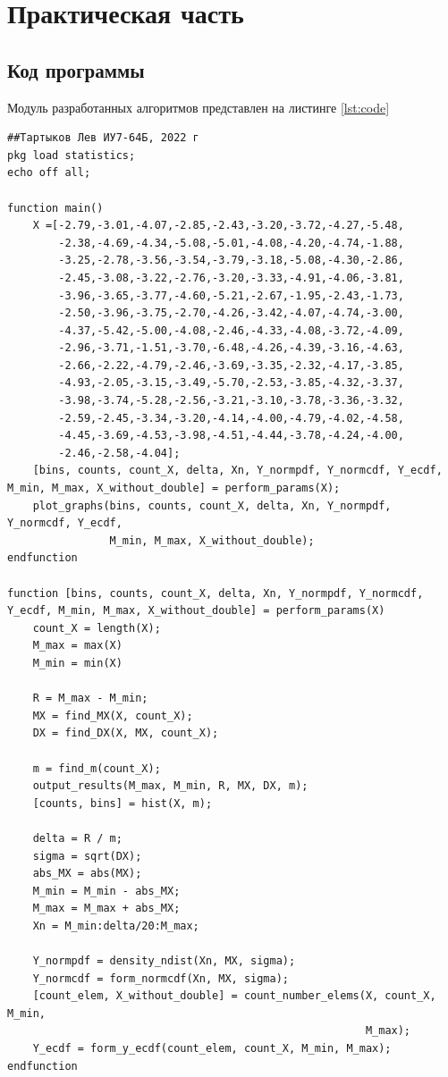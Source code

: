 \chapter{Практическая часть}
\section{Код программы}
Модуль разработанных алгоритмов представлен на листинге \ref{lst:code}
\begin{lstlisting}[label=lst:code, caption=Модуль разработанных алгоритмов, basicstyle=\footnotesize]
##Тартыков Лев ИУ7-64Б, 2022 г
pkg load statistics;
echo off all;

function main()
	X =[-2.79,-3.01,-4.07,-2.85,-2.43,-3.20,-3.72,-4.27,-5.48,
		-2.38,-4.69,-4.34,-5.08,-5.01,-4.08,-4.20,-4.74,-1.88,
		-3.25,-2.78,-3.56,-3.54,-3.79,-3.18,-5.08,-4.30,-2.86,
		-2.45,-3.08,-3.22,-2.76,-3.20,-3.33,-4.91,-4.06,-3.81,
		-3.96,-3.65,-3.77,-4.60,-5.21,-2.67,-1.95,-2.43,-1.73,
		-2.50,-3.96,-3.75,-2.70,-4.26,-3.42,-4.07,-4.74,-3.00,
		-4.37,-5.42,-5.00,-4.08,-2.46,-4.33,-4.08,-3.72,-4.09,
		-2.96,-3.71,-1.51,-3.70,-6.48,-4.26,-4.39,-3.16,-4.63,
		-2.66,-2.22,-4.79,-2.46,-3.69,-3.35,-2.32,-4.17,-3.85,
		-4.93,-2.05,-3.15,-3.49,-5.70,-2.53,-3.85,-4.32,-3.37,
		-3.98,-3.74,-5.28,-2.56,-3.21,-3.10,-3.78,-3.36,-3.32,
		-2.59,-2.45,-3.34,-3.20,-4.14,-4.00,-4.79,-4.02,-4.58,
		-4.45,-3.69,-4.53,-3.98,-4.51,-4.44,-3.78,-4.24,-4.00,
		-2.46,-2.58,-4.04];
	[bins, counts, count_X, delta, Xn, Y_normpdf, Y_normcdf, Y_ecdf, M_min, M_max, X_without_double] = perform_params(X);
	plot_graphs(bins, counts, count_X, delta, Xn, Y_normpdf, Y_normcdf, Y_ecdf, 
				M_min, M_max, X_without_double);
endfunction

function [bins, counts, count_X, delta, Xn, Y_normpdf, Y_normcdf, Y_ecdf, M_min, M_max, X_without_double] = perform_params(X)
	count_X = length(X);
	M_max = max(X)
	M_min = min(X)
	
	R = M_max - M_min;
	MX = find_MX(X, count_X);
	DX = find_DX(X, MX, count_X);
	
	m = find_m(count_X);
	output_results(M_max, M_min, R, MX, DX, m);
	[counts, bins] = hist(X, m);
	
	delta = R / m;
	sigma = sqrt(DX);
	abs_MX = abs(MX);
	M_min = M_min - abs_MX;
	M_max = M_max + abs_MX;
	Xn = M_min:delta/20:M_max;
	
	Y_normpdf = density_ndist(Xn, MX, sigma);
	Y_normcdf = form_normcdf(Xn, MX, sigma);
	[count_elem, X_without_double] = count_number_elems(X, count_X, M_min, 
														M_max);
	Y_ecdf = form_y_ecdf(count_elem, count_X, M_min, M_max);
endfunction


\end{lstlisting}
